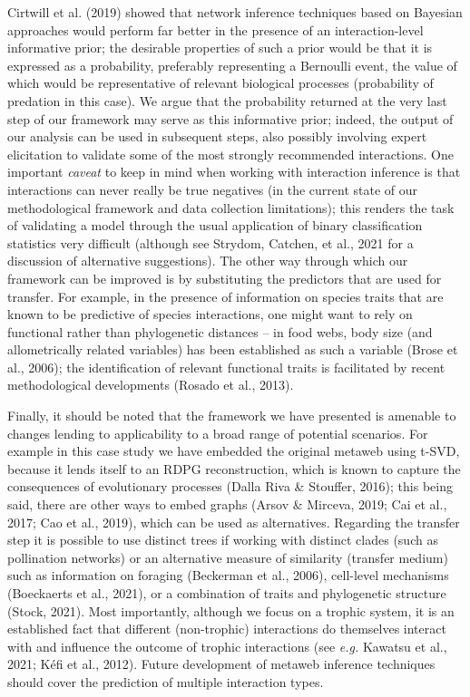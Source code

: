 \documentclass[10pt,oneside]{article}
\begin{document}
Cirtwill et al. (2019) showed that network inference techniques based on
Bayesian approaches would perform far better in the presence of an
interaction-level informative prior; the desirable properties of such a
prior would be that it is expressed as a probability, preferably
representing a Bernoulli event, the value of which would be
representative of relevant biological processes (probability of
predation in this case). We argue that the probability returned at the
very last step of our framework may serve as this informative prior;
indeed, the output of our analysis can be used in subsequent steps, also
possibly involving expert elicitation to validate some of the most
strongly recommended interactions. One important \emph{caveat} to keep
in mind when working with interaction inference is that interactions can
never really be true negatives (in the current state of our
methodological framework and data collection limitations); this renders
the task of validating a model through the usual application of binary
classification statistics very difficult (although see Strydom, Catchen,
et al., 2021 for a discussion of alternative suggestions). The other way
through which our framework can be improved is by substituting the
predictors that are used for transfer. For example, in the presence of
information on species traits that are known to be predictive of species
interactions, one might want to rely on functional rather than
phylogenetic distances -- in food webs, body size (and allometrically
related variables) has been established as such a variable (Brose et
al., 2006); the identification of relevant functional traits is
facilitated by recent methodological developments (Rosado et al., 2013).

Finally, it should be noted that the framework we have presented is
amenable to changes lending to applicability to a broad range of
potential scenarios. For example in this case study we have embedded the
original metaweb using t-SVD, because it lends itself to an RDPG
reconstruction, which is known to capture the consequences of
evolutionary processes (Dalla Riva \& Stouffer, 2016); this being said,
there are other ways to embed graphs (Arsov \& Mirceva, 2019; Cai et
al., 2017; Cao et al., 2019), which can be used as alternatives.
Regarding the transfer step it is possible to use distinct trees if
working with distinct clades (such as pollination networks) or an
alternative measure of similarity (transfer medium) such as information
on foraging (Beckerman et al., 2006), cell-level mechanisms (Boeckaerts
et al., 2021), or a combination of traits and phylogenetic structure
(Stock, 2021). Most importantly, although we focus on a trophic system,
it is an established fact that different (non-trophic) interactions do
themselves interact with and influence the outcome of trophic
interactions (see \emph{e.g.} Kawatsu et al., 2021; Kéfi et al., 2012).
Future development of metaweb inference techniques should cover the
prediction of multiple interaction types.
\end{document}
